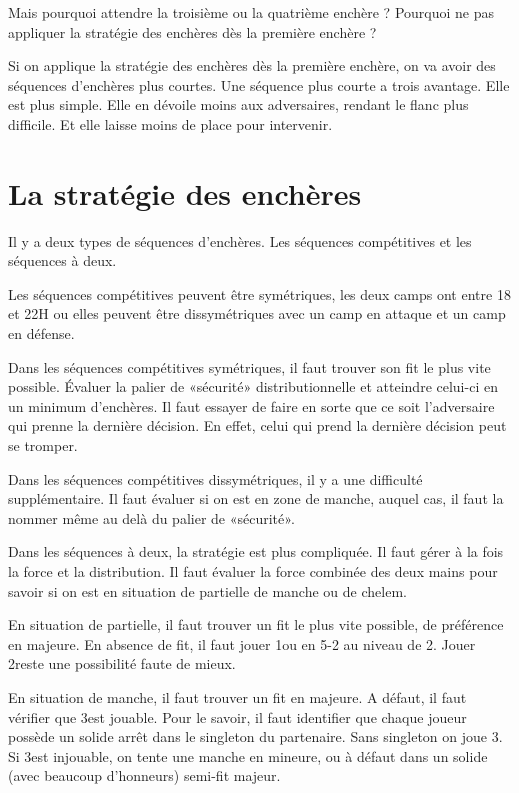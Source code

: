 Mais pourquoi attendre la troisième ou la quatrième enchère ? Pourquoi ne pas appliquer la stratégie des enchères dès la première enchère ?

Si on applique la stratégie des enchères dès la première enchère, on va avoir des séquences d'enchères plus courtes. Une séquence plus courte a trois avantage. Elle est plus simple. Elle en dévoile moins aux adversaires, rendant le flanc plus difficile. Et elle laisse moins de place pour intervenir.

\section{La stratégie des enchères}

Il y a deux types de séquences d'enchères. Les séquences compétitives et les séquences à deux.

Les séquences compétitives peuvent être symétriques, les deux camps ont entre 18 et 22H ou elles peuvent être dissymétriques avec un camp en attaque et un camp en défense.

Dans les séquences compétitives symétriques, il faut trouver son fit le plus vite possible. Évaluer la palier de «sécurité» distributionnelle et atteindre celui-ci en un minimum d'enchères. Il faut essayer de faire en sorte que ce soit l'adversaire qui prenne la dernière décision. En effet, celui qui prend la dernière décision peut se tromper.

Dans les séquences compétitives dissymétriques, il y a une difficulté supplémentaire. Il faut évaluer si on est en zone de manche, auquel cas, il faut la nommer même au delà du palier de «sécurité».

Dans les séquences à deux, la stratégie est plus compliquée. Il faut gérer à la fois la force et la distribution. Il faut évaluer la force combinée des deux mains pour savoir si on est en situation de partielle de manche ou de chelem.

En situation de partielle, il faut trouver un fit le plus vite possible, de préférence en majeure. En absence de fit, il faut jouer 1\NT ou en 5-2 au niveau de 2. Jouer 2\NT reste une possibilité faute de mieux.

En situation de manche, il faut trouver un fit en majeure. A défaut, il faut vérifier que 3\NT est jouable. Pour le savoir, il faut identifier que chaque joueur possède un solide arrêt dans le singleton du partenaire. Sans singleton on joue 3\NT. Si 3\NT est injouable, on tente une manche en mineure, ou à défaut dans un solide (avec beaucoup d'honneurs) semi-fit majeur.

